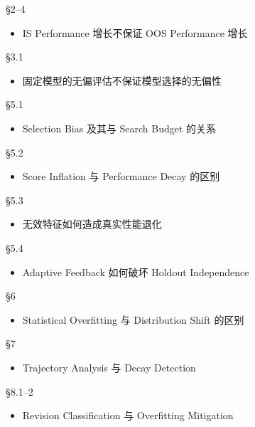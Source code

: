 §2--4

\begin{itemize}
\tightlist
\item
  IS Performance 增长不保证 OOS Performance 增长
\end{itemize}

§3.1

\begin{itemize}
\tightlist
\item
  固定模型的无偏评估不保证模型选择的无偏性
\end{itemize}

§5.1

\begin{itemize}
\tightlist
\item
  Selection Bias 及其与 Search Budget 的关系
\end{itemize}

§5.2

\begin{itemize}
\tightlist
\item
  Score Inflation 与 Performance Decay 的区别
\end{itemize}

§5.3

\begin{itemize}
\tightlist
\item
  无效特征如何造成真实性能退化
\end{itemize}

§5.4

\begin{itemize}
\tightlist
\item
  Adaptive Feedback 如何破坏 Holdout Independence
\end{itemize}

§6

\begin{itemize}
\tightlist
\item
  Statistical Overfitting 与 Distribution Shift 的区别
\end{itemize}

§7

\begin{itemize}
\tightlist
\item
  Trajectory Analysis 与 Decay Detection
\end{itemize}

§8.1--2

\begin{itemize}
\tightlist
\item
  Revision Classification 与 Overfitting Mitigation
\end{itemize}

